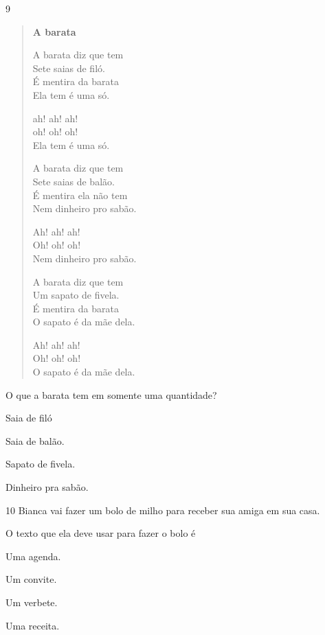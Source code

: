 \num{9}

\begin{verse}
\textbf{A barata}

A barata diz que tem\\
Sete saias de filó.\\
É mentira da barata\\
Ela tem é uma só.

ah! ah! ah!\\
oh! oh! oh!\\
Ela tem é uma só.

A barata diz que tem\\
Sete saias de balão.\\
É mentira ela não tem\\
Nem dinheiro pro sabão.

Ah! ah! ah!\\
Oh! oh! oh!\\
Nem dinheiro pro sabão.

A barata diz que tem\\
Um sapato de fivela.\\
É mentira da barata\\
O sapato é da mãe dela.

Ah! ah! ah!\\
Oh! oh! oh!\\
O sapato é da mãe dela.
\end{verse}


O que a barata tem em somente uma quantidade?

\begin{escolha}
\item Saia de filó

\item Saia de balão.

\item Sapato de fivela.

\item Dinheiro pra sabão.
\end{escolha}

\num{10} Bianca vai fazer um bolo de milho para receber sua amiga em sua casa.

O texto que ela deve usar para fazer o bolo é

\begin{escolha}
\item Uma agenda.

\item Um convite.

\item Um verbete.

\item Uma receita.
\end{escolha}


